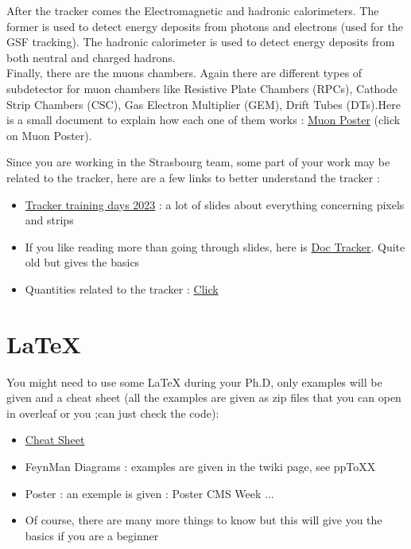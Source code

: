 \documentclass[reprint, a4paper, nofootinbib, amsmath, amssymb, aps]{revtex4-1}
\begin{document}
    After the tracker comes the Electromagnetic and hadronic calorimeters. The former is used to detect energy deposits from photons and electrons (used for the GSF tracking). The hadronic calorimeter is used to detect energy deposits from both neutral and charged hadrons. \\
    Finally, there are the muons chambers. Again there are different types of subdetector for muon chambers like Resistive Plate Chambers (RPCs), Cathode Strip Chambers (CSC), Gas Electron Multiplier (GEM), Drift Tubes (DTs).Here is a small document to explain how each one of them works : \href{https://cds.cern.ch/record/2698492/files/Poster-2019-989.pdf}{Muon Poster} (click on Muon Poster).

    Since you are working in the Strasbourg team, some part of your work may be related to the tracker, here are a few links to better understand the tracker :
    \begin{itemize}
        \item \href{https://indico.cern.ch/event/1238081/timetable/#20230227}{Tracker training days 2023} : a lot of slides about everything concerning pixels and strips
        \item If you like reading more than going through slides, here is \href{https://cds.cern.ch/record/914891/files/jpconf6_41_011.pdf}{Doc Tracker}. Quite old but gives the basics
        \item Quantities related to the tracker : \href{http://cms.cern.ch/iCMS/jsp/openfile.jsp?type=DN&year=2020&files=DN2020_004.pdf}{Click}
    \end{itemize}
    
\section{LaTeX}
    You might need to use some LaTeX during your Ph.D, only examples will be given and a cheat sheet (all the examples are given as zip files that you can open in overleaf or you ;can just check the code):
    \begin{itemize}
        \item \href{https://wch.github.io/latexsheet/}{Cheat Sheet}
        \item FeynMan Diagrams : examples are given in the twiki page, see ppToXX 
        \item Poster : an exemple is given : Poster CMS Week ...
        \item Of course, there are many more things to know but this will give you the basics if you are a beginner
    \end{itemize}
\end{document}
